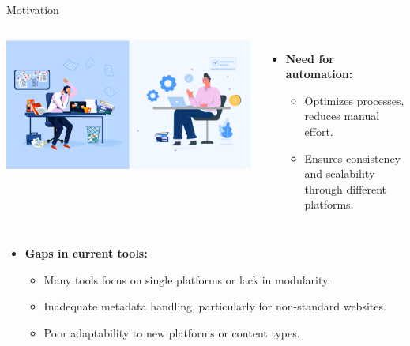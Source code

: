 \documentclass{beamer}
\begin{document}
    \begin{frame}{Motivation}
        \begin{columns}[T]
            \hspace{-0.5cm}
            \vspace{0.2cm}
            \begin{center}
                \includegraphics[width=1.63\textwidth, keepaspectratio]{images/introduction_motivation_slide_image.png}
            \end{center}

            \vspace{0.5cm}
            \begin{itemize}
                \item \textbf{Need for automation:}
                \begin{itemize}
                    \item Optimizes processes, reduces manual effort.
                    \item Ensures consistency and scalability through different platforms.
                \end{itemize}
            \end{itemize}
        \end{columns}

        \vspace{0.5cm}
        \begin{itemize}
            \item \textbf{Gaps in current tools:}
            \begin{itemize}
                \item Many tools focus on single platforms or lack in modularity.
                \item Inadequate metadata handling, particularly for non-standard websites.
                \item Poor adaptability to new platforms or content types.
            \end{itemize}
        \end{itemize}
    \end{frame}
\end{document}
